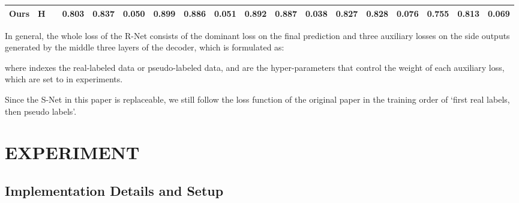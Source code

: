 \documentclass[journal]{IEEEtran}
\begin{document}
\begin{table*}[!t]
{\begin{tabular}{ccc|ccc|ccc|ccc|ccc|ccc}
Ours    & H  &   &  \textbf{0.803}    &  \textbf{0.837}    &  \textbf{0.050} & \textbf{0.899}    &  \textbf{0.886}    & \textbf{0.051} &  \textbf{0.892}    &  \textbf{0.887}    &  \textbf{0.038} &  \textbf{0.827}     &  \textbf{0.828}    &  \textbf{0.076} & \textbf{0.755}      & \textbf{0.813}     & \textbf{0.069} \\ \hline
\end{tabular}}
\label{table-compare_value}
\end{table*}

In general, the whole loss of the R-Net consists of the dominant loss  on the final prediction and three auxiliary losses  on the side outputs generated by the middle three layers of the decoder, which is formulated as:

where  indexes the real-labeled data or pseudo-labeled data, and  are the hyper-parameters that control the weight of each auxiliary loss, which are set to  in experiments.

Since the S-Net in this paper is replaceable, we still follow the loss function of the original paper in the training order of `first real labels, then pseudo labels'.
















\section{EXPERIMENT}
\subsection{Implementation Details and Setup}
\end{document}
